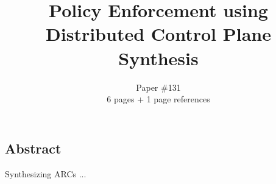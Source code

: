 \documentclass{hotnets16}
\begin{document}
 {}
\date{}


\title{Policy Enforcement using \\ Distributed Control Plane Synthesis}

\author{Paper \#131\\6 pages + 1 page references}

\maketitle


\subsection*{Abstract}

Synthesizing ARCs ...












 
\begin{small}

\end{small}
\label{last-page}
\end{document}
